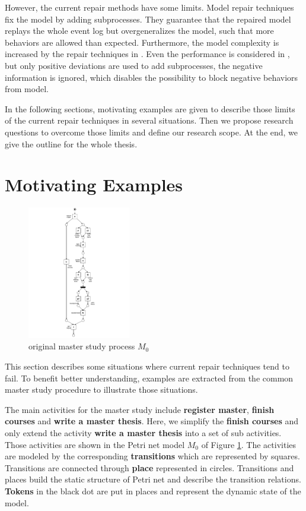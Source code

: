 However, the current repair methods have some limits. Model repair techniques fix the model by adding subprocesses. They guarantee that the repaired model replays the whole event log but overgeneralizes the model, such that more behaviors are allowed than expected. Furthermore, the model complexity is increased by the repair techniques in \cite{fahland2012repairing}.  Even the performance is considered in  \cite{dees2017enhancing}, but only positive deviations are used to add subprocesses, the negative information is ignored, which disables the possibility to block negative behaviors from model. 

In the following sections, motivating examples are given to describe those limits of the current repair techniques in several situations. Then we propose research questions to overcome those limits and define our research scope. At the end, we give the outline for the whole thesis.
\section{Motivating Examples}
\begin{figure}
	\centering
	\includegraphics[clip, trim=7cm 0cm 7cm 0cm, width=0.4\textwidth, height=0.7\textheight]{figures/introduction/Master-original-model.pdf}
	\caption{original master study process $M_0$}
	\label{fig:model_M0}
\end{figure}
This section describes some situations where current repair techniques tend to fail. To benefit better understanding, examples are extracted from the common master study procedure to illustrate those situations.

The main activities for the master study include \textbf{register master}, \textbf{finish courses} and \textbf{write a master thesis}. Here, we simplify the \textbf{finish courses} and only extend the activity \textbf{write a master thesis} into a set of sub activities. Those activities are shown in the Petri net model $M_0$ of Figure \ref{fig:model_M0}. The activities are modeled by the corresponding \textbf{\textbf{transitions}} which are represented by squares. Transitions are connected through \textbf{\textbf{place}} represented in circles. Transitions and places build the static structure of Petri net and describe the transition relations. \textbf{\textbf{Tokens}} in the black dot are put in places and represent the dynamic state of the model. 

